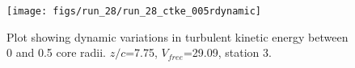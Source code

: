 \begin{figure}[H]
\centering
\texttt{[image: figs/run\_28/run\_28\_ctke\_005rdynamic]}
\caption{Plot showing dynamic variations in turbulent kinetic energy between 0 and 0.5 core radii. $z/c$=7.75, $V_{free}$=29.09, station 3.}
\label{fig:run_28_ctke_005rdynamic}
\end{figure}


